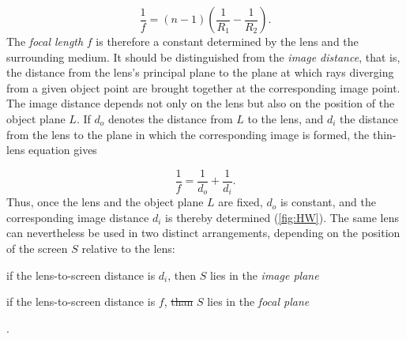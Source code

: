 \documentclass[pdflatex]{sn-jnl}
\providecommand{\DIFadd}[1]{{\protect\color{blue}\uwave{#1}}} %
\providecommand{\DIFdel}[1]{{\protect\color{red}\sout{#1}}}                      %
\providecommand{\DIFaddbegin}{} %
\providecommand{\DIFaddend}{} %
\providecommand{\DIFdelbegin}{} %
\providecommand{\DIFdelend}{} %
\begin{document}
\begin{equation*}
\frac{1}{f}=(n-1)\left(\frac{1}{R_1}-\frac{1}{R_2}\right).
\end{equation*}
%
The \emph{focal length} $f$ is therefore a constant determined by the lens and the surrounding medium. It should be distinguished from the \emph{image distance}, that is, the distance from the lens's principal plane to the plane at which rays diverging from a given object point are brought together at the corresponding image point. The image distance depends not only on the lens but also on the position of the object plane $L$. If $d_o$ denotes the distance from $L$ to the lens, and $d_i$ the distance from the lens to the plane in which the corresponding image is formed, the thin-lens equation gives

\begin{equation*}
\frac{1}{f}=\frac{1}{d_o}+\frac{1}{d_i}.
\end{equation*}
%
Thus, once the lens and the object plane $L$ are fixed, $d_o$ is constant, and the corresponding image distance $d_i$ is thereby determined (\cref{fig:HW}). The same lens can nevertheless be used in two distinct arrangements, depending on the position of the screen $S$ relative to the lens: \begin{inparaenum}[(a)] \item if the lens-to-screen distance is $d_i$, then $S$ lies in the \emph{image plane}\DIFaddbegin \DIFadd{; }\DIFaddend \item if the lens-to-screen distance is $f$, \DIFdelbegin \DIFdel{than }\DIFdelend \DIFaddbegin \DIFadd{then }\DIFaddend $S$ lies in the \emph{focal plane} \end{inparaenum}.


\DIFdelbegin %
\end{document}
